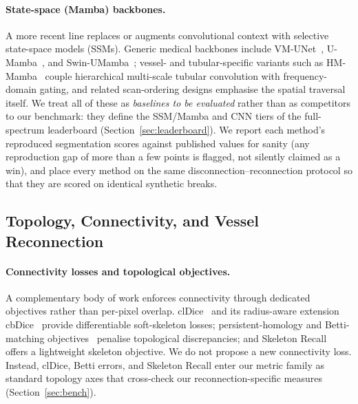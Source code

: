 \paragraph{State-space (Mamba) backbones.}
A more recent line replaces or augments convolutional context with selective
state-space models (SSMs). Generic medical backbones include
VM-UNet~\cite{key:vmunet}, U-Mamba~\cite{key:umamba}, and
Swin-UMamba~\cite{key:swinumamba}; vessel- and tubular-specific variants such as
HM-Mamba~\cite{key:hmmamba} couple hierarchical multi-scale tubular convolution
with frequency-domain gating, and related scan-ordering designs emphasise the
spatial traversal itself. We treat all of these as \emph{baselines to be
evaluated} rather than as competitors to our benchmark: they define the
SSM/Mamba and CNN tiers of the full-spectrum leaderboard
(Section~\ref{sec:leaderboard}). We report each method's reproduced segmentation
scores against published values for sanity (any reproduction gap of more than a
few points is flagged, not silently claimed as a win), and place every method on
the same disconnection--reconnection protocol so that they are scored on
identical synthetic breaks.

\subsection{Topology, Connectivity, and Vessel Reconnection}
\label{sec:related:topo}

\paragraph{Connectivity losses and topological objectives.}
A complementary body of work enforces connectivity through dedicated objectives
rather than per-pixel overlap. clDice~\cite{key:cldice} and its radius-aware
extension cbDice~\cite{key:cbdice} provide differentiable soft-skeleton losses;
persistent-homology and Betti-matching objectives~\cite{key:bettimatching}
penalise topological discrepancies; and Skeleton Recall~\cite{key:skeletonrecall}
offers a lightweight skeleton objective. We do not propose a new connectivity
loss. Instead, clDice, Betti errors, and Skeleton Recall enter our metric family
as standard topology axes that cross-check our reconnection-specific measures
(Section~\ref{sec:bench}).

